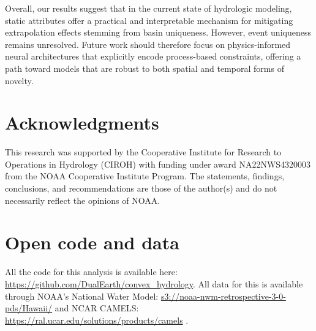 \documentclass{article}
\begin{document}
Overall, our results suggest that in the current state of hydrologic modeling, static attributes offer a practical and interpretable mechanism for mitigating extrapolation effects stemming from basin uniqueness. However, event uniqueness remains unresolved. Future work should therefore focus on physics-informed neural architectures that explicitly encode process-based constraints, offering a path toward models that are robust to both spatial and temporal forms of novelty.

\section*{Acknowledgments}
This research was supported by the Cooperative Institute for Research to Operations in Hydrology (CIROH) with funding under award NA22NWS4320003 from the NOAA Cooperative Institute Program. The statements, findings, conclusions, and recommendations are those of the author(s) and do not necessarily reflect the opinions of NOAA.

\section{Open code and data}
All the code for this analysis is available here: \url{https://github.com/DualEarth/convex_hydrology}. All data for this is available through NOAA's National Water Model: \url{s3://noaa-nwm-retrospective-3-0-pds/Hawaii/} \cite{cosgrove2024noaa} and NCAR CAMELS: \url{https://ral.ucar.edu/solutions/products/camels} \cite{addor2017camels}.

  
  
\end{document}
